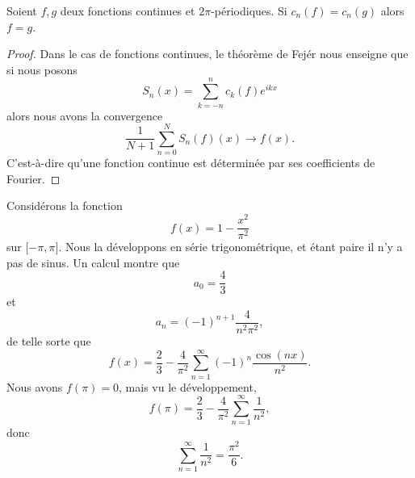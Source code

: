 \begin{corollary}   \label{CordgtXlC}
    Soient \( f,g\) deux fonctions continues et \( 2\pi\)-périodiques. Si \( c_n(f)=c_n(g)\) alors \( f=g\).
\end{corollary}

\begin{proof}
    Dans le cas de fonctions continues, le théorème de Fejér nous enseigne que si nous posons
    \begin{equation}
        S_n(x)=\sum_{k=-n}^{n}c_k(f) e^{ikx}
    \end{equation}
    alors nous avons la convergence
    \begin{equation}
        \frac{1}{ N+1 }\sum_{n=0}^NS_n(f)(x)\to f(x).
    \end{equation}
    C'est-à-dire qu'une fonction continue est déterminée par ses coefficients de Fourier.
\end{proof}

\begin{example}
    Considérons la fonction
    \begin{equation}
        f(x)=1-\frac{ x^2 }{ \pi^2 }
    \end{equation}
    sur \( \mathopen[ -\pi , \pi \mathclose]\). Nous la développons en série trigonométrique, et étant paire il n'y a pas de sinus. Un calcul montre que
    \begin{equation}
        a_0=\frac{ 4 }{ 3 }
    \end{equation}
    et
    \begin{equation}
        a_n=(-1)^{n+1}\frac{ 4 }{ n^2\pi^2 },
    \end{equation}
    de telle sorte que
    \begin{equation}
        f(x)=\frac{ 2 }{ 3 }-\frac{ 4 }{ \pi^2 }\sum_{n=1}^{\infty}(-1)^n\frac{ \cos(nx) }{ n^2 }.
    \end{equation}
    Nous avons \( f(\pi)=0\), mais vu le développement,
    \begin{equation}
        f(\pi)=\frac{ 2 }{ 3 }-\frac{ 4 }{ \pi^2 }\sum_{n=1}^{\infty}\frac{1}{ n^2 },
    \end{equation}
    donc
    \begin{equation}
        \sum_{n=1}^{\infty}\frac{1}{ n^2 }=\frac{ \pi^2 }{ 6 }.
    \end{equation}
\end{example}

